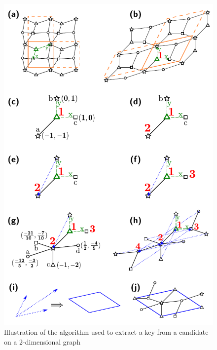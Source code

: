 \documentclass[main.tex]{subfiles}
\begin{document}
\begin{figure}[p]
	\begin{center}
		\includegraphics[width=0.9\linewidth]{figures/topology/candidates.pdf}
	\end{center}
	\caption{Illustration of the algorithm used to extract a key from a candidate on a 2-dimensional graph}
\end{figure}
\end{document}
